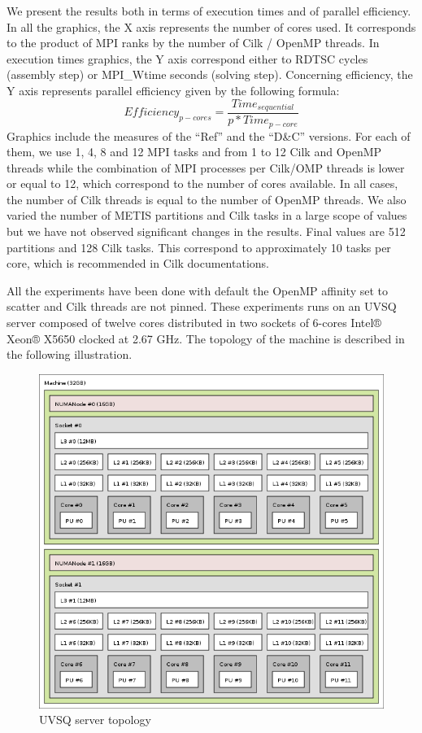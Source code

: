 \documentclass{IOS-Book-Article}
\begin{document}
We present the results both in terms of execution times and of parallel efficiency.
In all the graphics, the X axis represents the number of cores used. It corresponds to the product of MPI ranks by the number of Cilk / OpenMP threads.
In execution times graphics, the Y axis correspond either to RDTSC cycles (assembly step) or MPI\_Wtime seconds (solving step).
Concerning efficiency, the Y axis represents parallel efficiency given by the following formula:
$$Efficiency_{p-cores} = \frac{Time_{sequential}}{p*Time_{p-core}}$$
Graphics include the measures of the “Ref” and the “D\&C” versions.
For each of them, we use 1, 4, 8 and 12 MPI tasks and from 1 to 12 Cilk and OpenMP threads while the combination of MPI processes per Cilk/OMP threads is lower or equal to 12,
which correspond to the number of cores available. In all cases, the number of Cilk threads is equal to the number of OpenMP threads.
We also varied the number of METIS partitions and Cilk tasks in a large scope of values but we have not observed significant changes in the results.
Final values are 512 partitions and 128 Cilk tasks. This correspond to approximately 10 tasks per core, which is recommended in Cilk documentations.

All the experiments have been done with default the OpenMP affinity set to scatter and Cilk threads are not pinned. These experiments runs on an UVSQ server
composed of twelve cores distributed in two sockets of 6-cores Intel® Xeon® X5650 clocked at 2.67 GHz. The topology of the machine is described in the following illustration.
\begin{figure}[htp]
 \centering
 \label{fig5}
 \includegraphics[scale=0.35]{topo_mauduit.png}
 \caption{UVSQ server topology}
\end{figure}
\end{document}
